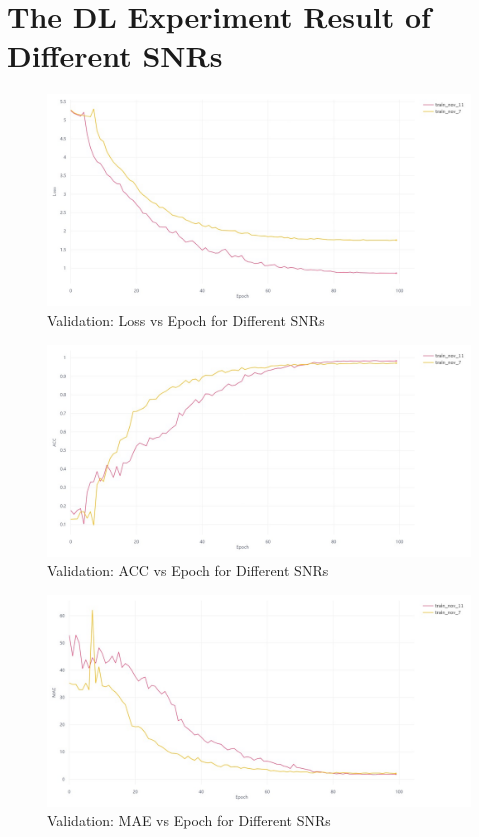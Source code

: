 \section*{The DL Experiment Result of Different SNRs}
\begin{figure}[H]
    \centering
    \includegraphics[width=1\linewidth]{figures/SNRs Valid_ Loss VS epoch.jpeg}
    \caption{Validation: Loss vs Epoch for Different SNRs}
\end{figure}
\begin{figure}[H]
    \centering
    \includegraphics[width=1\linewidth]{figures/SNRs Valid_ ACC VS epoch.jpeg}
    \caption{Validation: ACC vs Epoch for Different SNRs}
\end{figure}
\begin{figure}[H]
    \centering
    \includegraphics[width=1\linewidth]{figures/SNRs Valid_ MAE VS epoch.jpeg}
    \caption{Validation: MAE vs Epoch for Different SNRs}
\end{figure}
